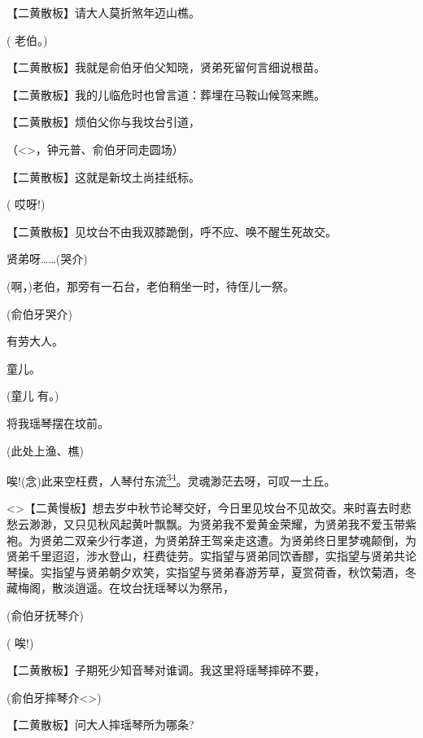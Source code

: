 { 【二黄散板】请大人莫折煞年迈山樵。

( 老伯。)

 【二黄散板】我就是俞伯牙伯父知晓，贤弟死留何言细说根苗。

 【二黄散板】我的儿临危时也曾言道：葬埋在马鞍山候驾来瞧。

 【二黄散板】烦伯父你与我坟台引道，

（\textless{}\!\textgreater{}，钟元普、俞伯牙同走圆场）

 【二黄散板】这就是新坟土尚挂纸标。

( 哎呀!)

 【二黄散板】见坟台不由我双膝跪倒，呼不应、唤不醒生死故交。

 贤弟呀\ldots{}\ldots{}(哭介)

 (啊，)老伯，那旁有一石台，老伯稍坐一时，待侄儿一祭。

(俞伯牙哭介)

 有劳大人。

 童儿。

(童儿 有。)

 将我瑶琴摆在坟前。

(此处上渔、樵)

 唉!({\akai 念})此来空枉费，人琴付东流\protect\hyperlink{fn34}{\textsuperscript{34}}。灵魂渺茫去呀，可叹一土丘。

 \textless{}\!\textgreater{}【二黄慢板】想去岁中秋节论琴交好，今日里见坟台不见故交。来时喜去时悲愁云渺渺，又只见秋风起黄叶飘飘。为贤弟我不爱黄金荣耀，为贤弟我不爱玉带紫袍。为贤弟二双亲少行孝道，为贤弟辞王驾亲走这遭。为贤弟终日里梦魂颠倒，为贤弟千里迢迢，涉水登山，枉费徒劳。实指望与贤弟同饮香醪，实指望与贤弟共论琴操。实指望与贤弟朝夕欢笑，实指望与贤弟春游芳草，夏赏荷香，秋饮菊酒，冬藏梅阁，散淡逍遥。在坟台抚瑶琴以为祭吊，

(俞伯牙抚琴介)

( 唉!)

 【二黄散板】子期死少知音琴对谁调。我这里将瑶琴摔碎不要，

(俞伯牙摔琴介\textless{}\!\textgreater{})

 【二黄散板】问大人摔瑶琴所为哪条?

}

